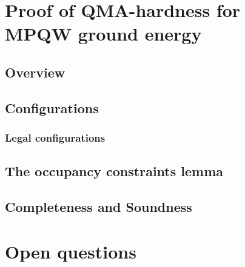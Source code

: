 \documentclass[../thesis-main/thesis-main]{subfiles}
\begin{document}
\section{Proof of QMA-hardness for MPQW ground energy}

\subsection{Overview}

\subsection{Configurations}

\subsubsection{Legal configurations}

\subsection{The occupancy constraints lemma}

\subsection{Completeness and Soundness}

\section{Open questions}
\end{document}
